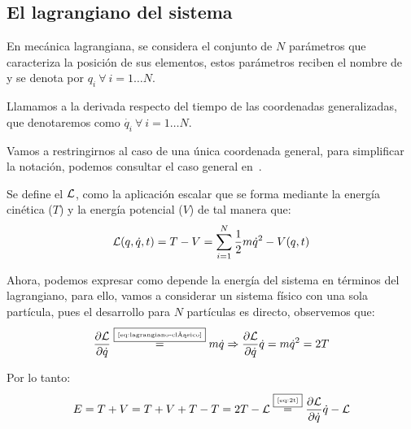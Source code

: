 \subsection{El lagrangiano del sistema}\label{subsec:el-lagrangiano-del-sistema}
En mecánica lagrangiana, se considera el conjunto de $N$ parámetros que caracteriza la posición de sus elementos, estos parámetros reciben el nombre de ~\cite{GTP} y se denota por $q_i\ \forall\ i=1\dots N$.

Llamamos  a la derivada respecto del tiempo de las coordenadas generalizadas, que denotaremos como $\dot{q_i}\ \forall\ i=1\dots N$.

Vamos a restringirnos al caso de una única coordenada general, para simplificar la notación, podemos consultar el caso general en~\cite{Goldstein}.

Se define el  $\mathcal{L}$, como la aplicación escalar que se forma mediante la energía cinética ($T$) y la energía potencial ($V$) de tal manera que:
\begin{equation}
	\label{eq:lagrangiano-clásico}
	\mathcal{L}(q,\dot{q},t)=T-V=\sum\limits_{i=1}^{N} \frac{1}{2}m\dot{q}^2-V(q,t)
\end{equation}

Ahora, podemos expresar como depende la energía del sistema en términos del lagrangiano, para ello, vamos a considerar un sistema físico con una sola partícula, pues el desarrollo para $N$ partículas es directo, observemos que:
\begin{equation}
	\label{eq:2t}
	\frac{\partial\mathcal{L}}{\partial\dot{q}}\overset{\fbox{\tiny \ref{eq:lagrangiano-clásico}}}{=}m\dot{q}\Rightarrow \frac{\partial\mathcal{L}}{\partial\dot{q}}\dot{q} =m\dot{q}^2 = 2T
\end{equation}

Por lo tanto:
\begin{equation}
	\label{eq:energía-lagrangiana}
	E=T+V=T+V+T-T=2T-\mathcal{L}\overset{\fbox{\tiny \ref{eq:2t}}}{=}\frac{\partial\mathcal{L}}{\partial\dot{q}}\dot{q}-\mathcal{L}
\end{equation}